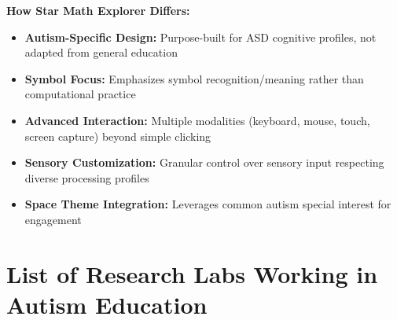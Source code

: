 \documentclass[11pt, a4paper]{article}
\begin{document}
\renewcommand{\arraystretch}{1}

\textbf{How Star Math Explorer Differs:}
\begin{itemize}[leftmargin=*]
    \item \textbf{Autism-Specific Design:} Purpose-built for ASD cognitive profiles, not adapted from general education
    \item \textbf{Symbol Focus:} Emphasizes symbol recognition/meaning rather than computational practice
    \item \textbf{Advanced Interaction:} Multiple modalities (keyboard, mouse, touch, screen capture) beyond simple clicking
    \item \textbf{Sensory Customization:} Granular control over sensory input respecting diverse processing profiles
    \item \textbf{Space Theme Integration:} Leverages common autism special interest for engagement
\end{itemize}

\newpage

\section{List of Research Labs Working in Autism Education}
\end{document}
